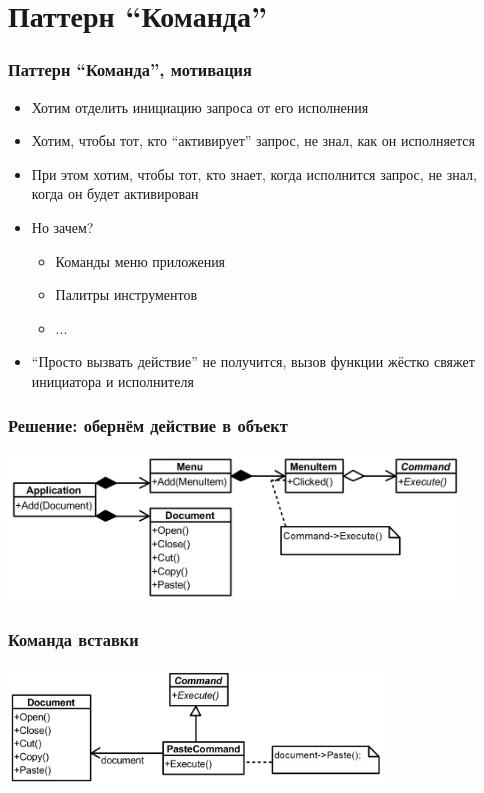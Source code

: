 \documentclass{../../slides-style}
\begin{document}
    \begin{frame}[plain]
        \titlepage
    \end{frame}

    \section{Паттерн ``Команда''}

    \begin{frame}
        \frametitle{Паттерн ``Команда'', мотивация}
        \begin{itemize}
            \item Хотим отделить инициацию запроса от его исполнения
            \item Хотим, чтобы тот, кто ``активирует'' запрос, не знал, как он исполняется
            \item При этом хотим, чтобы тот, кто знает, когда исполнится запрос, не знал, когда он будет активирован
            \item Но зачем?
            \begin{itemize}
                \item Команды меню приложения
                \item Палитры инструментов
                \item ...
            \end{itemize}
            \item ``Просто вызвать действие'' не получится, вызов функции жёстко свяжет инициатора и исполнителя
        \end{itemize}
    \end{frame}

    \begin{frame}
        \frametitle{Решение: обернём действие в объект}
        \begin{center}
            \includegraphics[width=0.9\textwidth]{commandExample.png}
        \end{center}
    \end{frame}

    \begin{frame}
        \frametitle{Команда вставки}
        \begin{center}
            \includegraphics[width=0.75\textwidth]{pasteCommand.png}
        \end{center}
    \end{frame}
\end{document}
